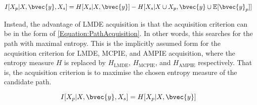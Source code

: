 		\begin{equation}
			I[X_{p} | X, \bvec{y}, X_{s}] = H[X_{s} | X, \bvec{y}] - H[X_{s} | X \cup X_{p}, \bvec{y} \cup \mathbb{E}[\bvec{y}_{p}]]
		\label{Equation:DifferentialAcquisition}
		\end{equation}
		
		Instead, the advantage of LMDE acquisition is that the acquisition criterion can be in the form of \eqref{Equation:PathAcquisition}. In other words, this searches for the path with maximal entropy. This is the implicitly assumed form for the acquisition criterion for LMDE, MCPIE, and AMPIE acquisition, where the entropy measure $H$ is replaced by $H_{\mathrm{LMDE}}$, $H_{\mathrm{MCPIE}}$, and $H_{\mathrm{AMPIE}}$ respectively. That is, the acquisition criterion is to maximise the chosen entropy measure of the candidate path.

		\begin{equation}
			I[X_{p} | X, \bvec{y}, X_{s}] = H[X_{p} | X, \bvec{y}]
		\label{Equation:PathAcquisition}
		\end{equation}
		